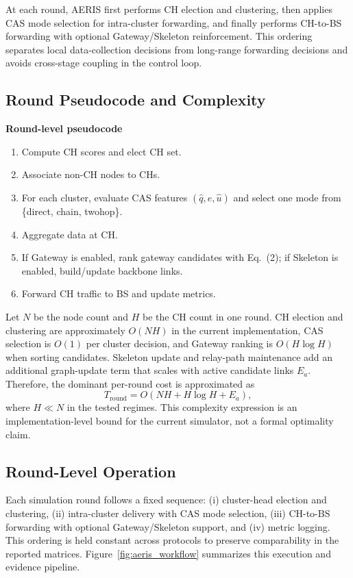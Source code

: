 ﻿\documentclass[sensors,article,submit,moreauthors,pdftex]{Definitions/mdpi}
\begin{document}
At each round, AERIS first performs CH election and clustering, then applies CAS mode selection for intra-cluster forwarding, and finally performs CH-to-BS forwarding with optional Gateway/Skeleton reinforcement. This ordering separates local data-collection decisions from long-range forwarding decisions and avoids cross-stage coupling in the control loop.

\subsection{Round Pseudocode and Complexity}
\textbf{Round-level pseudocode}
\begin{enumerate}
\item Compute CH scores and elect CH set.
\item Associate non-CH nodes to CHs.
\item For each cluster, evaluate CAS features $(\hat{q},\hat{e},\hat{u})$ and select one mode from \{direct, chain, twohop\}.
\item Aggregate data at CH.
\item If Gateway is enabled, rank gateway candidates with Eq.~(2); if Skeleton is enabled, build/update backbone links.
\item Forward CH traffic to BS and update metrics.
\end{enumerate}

Let $N$ be the node count and $H$ be the CH count in one round. CH election and clustering are approximately $O(NH)$ in the current implementation, CAS selection is $O(1)$ per cluster decision, and Gateway ranking is $O(H\log H)$ when sorting candidates. Skeleton update and relay-path maintenance add an additional graph-update term that scales with active candidate links $E_a$. Therefore, the dominant per-round cost is approximated as
\begin{equation}
T_{\mathrm{round}} = O(NH + H\log H + E_a),
\end{equation}
where $H \ll N$ in the tested regimes. This complexity expression is an implementation-level bound for the current simulator, not a formal optimality claim.

\subsection{Round-Level Operation}
Each simulation round follows a fixed sequence: (i) cluster-head election and clustering, (ii) intra-cluster delivery with CAS mode selection, (iii) CH-to-BS forwarding with optional Gateway/Skeleton support, and (iv) metric logging. This ordering is held constant across protocols to preserve comparability in the reported matrices. Figure~\ref{fig:aeris_workflow} summarizes this execution and evidence pipeline.
\end{document}
